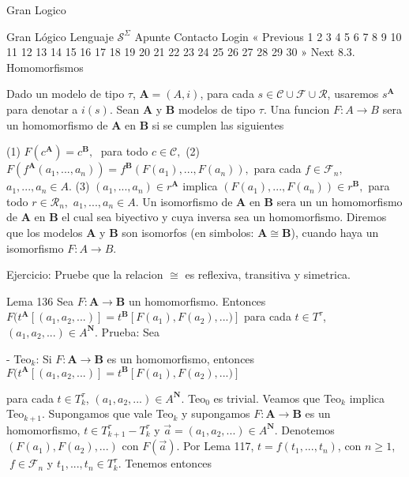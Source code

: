 Gran Logico

Gran Lógico
Lenguaje \(\mathcal{S}^{\Sigma }\)
Apunte
Contacto
Login
« Previous
1
2
3
4
5
6
7
8
9
10
11
12
13
14
15
16
17
18
19
20
21
22
23
24
25
26
27
28
29
30
» Next
8.3. Homomorfismos

Dado un modelo de tipo \(\tau \), \(\mathbf{A}=(A,i)\), para cada \(s\in \mathcal{ C}\cup \mathcal{F}\cup \mathcal{R}\), usaremos \(s^{\mathbf{A}}\) para denotar a \(i(s)\). Sean \(\mathbf{A}\) y \(\mathbf{B}\) modelos de tipo \(\tau \). Una funcion \(F:A\rightarrow B\) sera un homomorfismo de \(\mathbf{A}\) en \(\mathbf{B}\) si se cumplen las siguientes

(1) \(F(c^{\mathbf{A}})=c^{\mathbf{B}},\;\) para todo \(c\in \mathcal{C} , \)
(2) \(F(f^{\mathbf{A}}(a_{1},...,a_{n}))=f^{\mathbf{B} }(F(a_{1}),...,F(a_{n})),\) para cada \(f\in \mathcal{F}_{n},\) \( a_{1},...,a_{n}\in A\).
(3) \((a_{1},...,a_{n})\in r^{\mathbf{A}}\) implica \( (F(a_{1}),...,F(a_{n}))\in r^{\mathbf{B}},\) para todo \(r\in \mathcal{R}_{n},\) \(a_{1},...,a_{n}\in A.\)
Un isomorfismo de \(\mathbf{A}\) en \(\mathbf{B}\) sera un un homomorfismo de \(\mathbf{A}\) en \(\mathbf{B}\) el cual sea biyectivo y cuya inversa sea un homomorfismo. Diremos que los modelos \( \mathbf{A}\) y \(\mathbf{B}\) son isomorfos (en simbolos: \(\mathbf{A} \cong \mathbf{B}\)), cuando haya un isomorfismo \(F:A\rightarrow B.\)

Ejercicio: Pruebe que la relacion \(\cong \) es reflexiva, transitiva y simetrica.

Lema 136 Sea \(F:\mathbf{A}\rightarrow \mathbf{B}\) un homomorfismo. Entonces
\(\displaystyle F(t^{\mathbf{A}}[(a_{1},a_{2},...)]=t^{\mathbf{B}}[F(a_{1}),F(a_{2}),...)] \)
para cada \(t\in T^{\tau }\), \((a_{1},a_{2},...)\in A^{\mathbf{N}}\).
Prueba: Sea

- Teo\(_{k}\): Si \(F:\mathbf{A}\rightarrow \mathbf{B}\) es un homomorfismo, entonces
\(\displaystyle F(t^{\mathbf{A}}[(a_{1},a_{2},...)]=t^{\mathbf{B}}[F(a_{1}),F(a_{2}),...)] \)

para cada \(t\in T_{k}^{\tau }\), \((a_{1},a_{2},...)\in A^{\mathbf{N}}\).
Teo\(_{0}\) es trivial. Veamos que Teo\(_{k}\) implica Teo\(_{k+1}\). Supongamos que vale Teo\(_{k}\) y supongamos \(F:\mathbf{A}\rightarrow \mathbf{B}\) es un homomorfismo, \(t\in T_{k+1}^{\tau }-T_{k}^{\tau }\) y \(\vec{a} =(a_{1},a_{2},...)\in A^{\mathbf{N}}\). Denotemos \((F(a_{1}),F(a_{2}),...)\) con \(F(\vec{a})\). Por Lema 117, \(t=f(t_{1},...,t_{n})\), con \(n\geq 1 \),\(\;f\in \mathcal{F}_{n}\) y \(t_{1},...,t_{n}\in T_{k}^{\tau }\). Tenemos entonces


